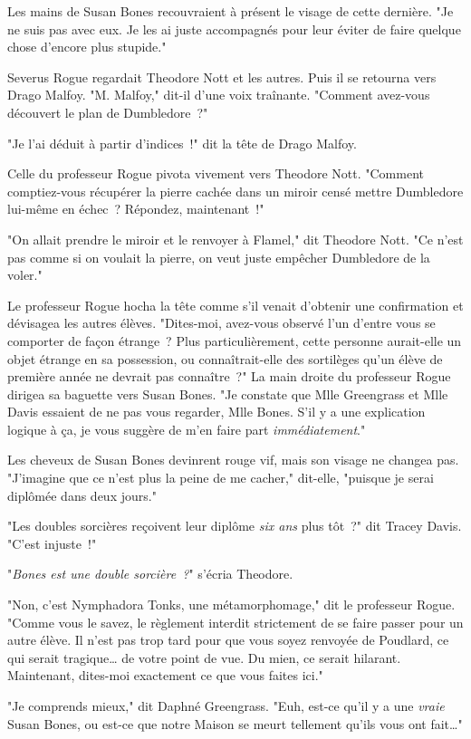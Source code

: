 Les mains de Susan Bones recouvraient à présent le visage de cette dernière. "Je ne suis pas avec eux. Je les ai juste accompagnés pour leur éviter de faire quelque chose d'encore plus stupide."

Severus Rogue regardait Theodore Nott et les autres. Puis il se retourna vers Drago Malfoy. "M. Malfoy," dit-il d'une voix traînante. "Comment avez-vous découvert le plan de Dumbledore~?"

"Je l'ai déduit à partir d'indices~!" dit la tête de Drago Malfoy.

Celle du professeur Rogue pivota vivement vers Theodore Nott. "Comment comptiez-vous récupérer la pierre cachée dans un miroir censé mettre Dumbledore lui-même en échec~? Répondez, maintenant~!"

"On allait prendre le miroir et le renvoyer à Flamel," dit Theodore Nott. "Ce n'est pas comme si on voulait la pierre, on veut juste empêcher Dumbledore de la voler."

Le professeur Rogue hocha la tête comme s'il venait d'obtenir une confirmation et dévisagea les autres élèves. "Dites-moi, avez-vous observé l'un d'entre vous se comporter de façon étrange~? Plus particulièrement, cette personne aurait-elle un objet étrange en sa possession, ou connaîtrait-elle des sortilèges qu'un élève de première année ne devrait pas connaître~?" La main droite du professeur Rogue dirigea sa baguette vers Susan Bones. "Je constate que Mlle Greengrass et Mlle Davis essaient de ne pas vous regarder, Mlle Bones. S'il y a une explication logique à ça, je vous suggère de m'en faire part \emph{immédiatement}."

Les cheveux de Susan Bones devinrent rouge vif, mais son visage ne changea pas. "J'imagine que ce n'est plus la peine de me cacher," dit-elle, "puisque je serai diplômée dans deux jours."

"Les doubles sorcières reçoivent leur diplôme \emph{six ans} plus tôt~?" dit Tracey Davis. "C'est injuste~!"

"\emph{Bones est une double sorcière~?}" s'écria Theodore.

"Non, c'est Nymphadora Tonks, une métamorphomage," dit le professeur Rogue. "Comme vous le savez, le règlement interdit strictement de se faire passer pour un autre élève. Il n'est pas trop tard pour que vous soyez renvoyée de Poudlard, ce qui serait tragique… de votre point de vue. Du mien, ce serait hilarant. Maintenant, dites-moi exactement ce que vous faites ici."

"Je comprends mieux," dit Daphné Greengrass. "Euh, est-ce qu'il y a une \emph{vraie} Susan Bones, ou est-ce que notre Maison se meurt tellement qu'ils vous ont fait…"

